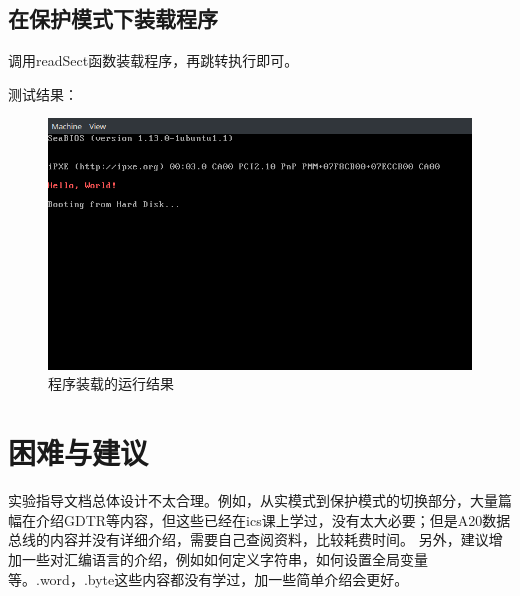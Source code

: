\documentclass[12pt,a4paper,UTF8]{article}
\begin{document}
\newpage
\subsection{在保护模式下装载程序}
调用readSect函数装载程序，再跳转执行即可。

测试结果：
\begin{figure}[htbp]
	\centering
	\includegraphics[width=\textwidth]{load}
	\caption{程序装载的运行结果}
\end{figure}

\section{困难与建议}
实验指导文档总体设计不太合理。例如，从实模式到保护模式的切换部分，大量篇幅在介绍GDTR等内容，但这些已经在ics课上学过，没有太大必要；但是A20数据总线的内容并没有详细介绍，需要自己查阅资料，比较耗费时间。
另外，建议增加一些对汇编语言的介绍，例如如何定义字符串，如何设置全局变量等。.word，.byte这些内容都没有学过，加一些简单介绍会更好。
\end{document}
